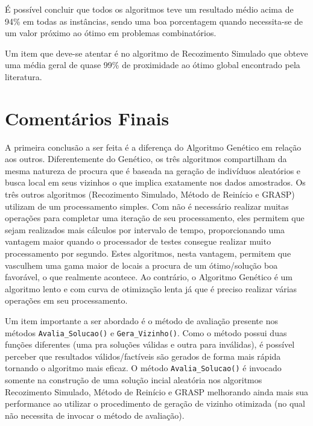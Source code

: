 \documentclass[portugues, brazil, a4paper,12pt]{article}
\begin{document}
	É possível concluir que todos os algoritmos teve um resultado médio acima de 94\% em todas as instâncias, sendo uma boa porcentagem quando necessita-se de um valor próximo ao ótimo em problemas combinatórios.
	
	Um item que deve-se atentar é no algoritmo de Recozimento Simulado que obteve uma média geral de quase 99\% de proximidade ao ótimo global encontrado pela literatura.
	


\section{Comentários Finais}\label{sec:figs}
	A primeira conclusão a ser feita é a diferença do Algoritmo Genético em relação aos outros. Diferentemente do Genético, os três algoritmos compartilham da mesma natureza de procura que é baseada na geração de indivíduos aleatórios e busca local em seus vizinhos o que implica exatamente nos dados amostrados. Os três outros algoritmos (Recozimento Simulado, Método de Reinício e GRASP) utilizam de um processamento simples. Com não é necessário realizar muitas operações para completar uma iteração de seu processamento, eles permitem que sejam realizados mais cálculos por intervalo de tempo, proporcionando uma vantagem maior quando o processador de testes consegue realizar muito processamento por segundo. Estes algoritmos, nesta vantagem, permitem que vasculhem uma gama maior de locais a procura de um ótimo/solução boa favorável, o que realmente acontece. Ao contrário, o Algoritmo Genético é um algoritmo lento e com curva de otimização lenta já que é preciso realizar várias operações em seu processamento.
	
	Um item importante a ser abordado é o método de avaliação presente nos métodos \verb|Avalia_Solucao()| e \verb|Gera_Vizinho()|. Como o método possui duas funções diferentes (uma pra soluções válidas e outra para inválidas), é possível perceber que resultados válidos/factíveis são gerados de forma mais rápida tornando o algoritmo mais eficaz. O método \verb|Avalia_Solucao()| é invocado somente na construção de uma solução incial aleatória nos algoritmos Recozimento Simulado, Método de Reinício e GRASP melhorando ainda mais sua performance ao utilizar o procedimento de geração de vizinho otimizada (no qual não necessita de invocar o método de avaliação).
	
\end{document}
